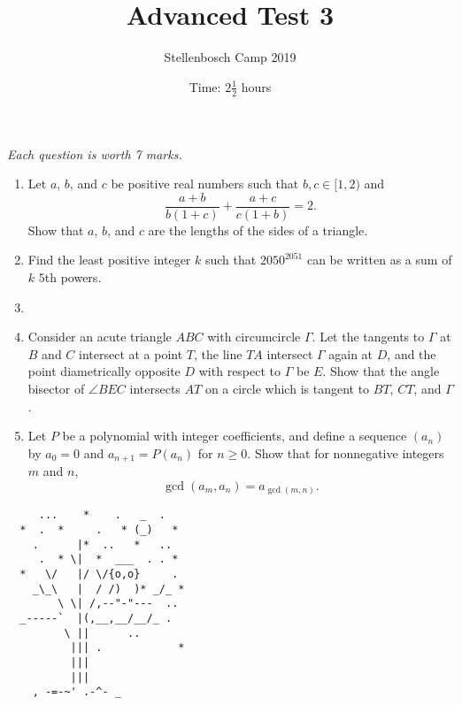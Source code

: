 \documentclass{article}
\title{Advanced Test 3}
\author{Stellenbosch Camp 2019}
\date{Time: $2\frac{1}{2}$ hours}
\begin{document}
\maketitle
\thispagestyle{empty}

\hfill\textit{Each question is worth 7 marks.}

\vfill


\begin{enumerate}[1.]

\item %
Let $a$, $b$, and $c$ be positive real numbers such that $b, c \in [1,2)$ and
\[ \frac{a+b}{b(1+c)} +\frac{a+c}{c(1+b)} = 2. \]
Show that $a$, $b$, and $c$ are the lengths of the sides of a triangle.


\item %
Find the least positive integer $k$ such that $2050^{2051}$ can be written as a sum of $k$ $5$th powers.


\item %


\item %
Consider an acute triangle $ABC$ with circumcircle $\Gamma$.
Let the tangents to $\Gamma$ at $B$ and $C$ intersect at a point $T$, the line $TA$ intersect $\Gamma$ again at $D$, and the point diametrically opposite $D$ with respect to $\Gamma$ be $E$.
Show that the angle bisector of $\angle BEC$ intersects $AT$ on a circle which is tangent to $BT$, $CT$, and $\Gamma$.


\item %
Let $P$ be a polynomial with integer coefficients, and define a sequence $(a_n)$ by $a_0 = 0$ and $a_{n+1} = P(a_n)$ for $n \geq 0$.
Show that for nonnegative integers $m$ and $n$,
\[ \gcd(a_m,a_n) = a_{\gcd(m,n)}. \]


\end{enumerate}


\vfill
\begin{center}
\begin{BVerbatim}
     ...    *    .   _  .
  *  .  *     .   * (_)   *
    .      |*  ..   *   ..
     .  * \|  *  ___  . . *
  *   \/   |/ \/{o,o}     .
    _\_\   |  / /)  )* _/_ *
        \ \| /,--"-"---  ..
  _-----`  |(,__,__/__/_ .
         \ ||      ..
          ||| .            *
          |||
          |||
    , -=-~' .-^- _
\end{BVerbatim}
\end{center}
\end{document}
